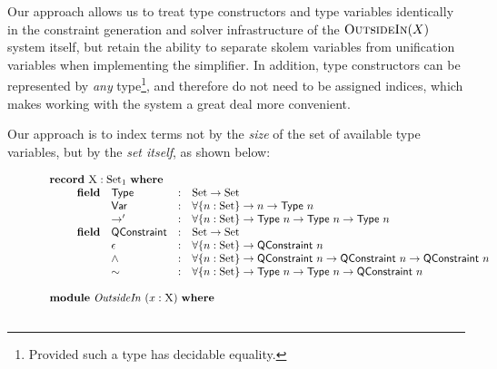 \documentclass[a4paper]{jfp}
\newcommand{\outsidein}{\textsc{OutsideIn}(X)}
\begin{document}
Our approach allows us to treat type constructors and type variables identically in the constraint generation and solver infrastructure of the
$\outsidein$ system itself, but retain the ability to separate skolem variables from unification variables when implementing the simplifier. 
In addition, type constructors can be represented by \emph{any} type\footnote{Provided such a type has decidable equality.}, and therefore
do not need to be assigned indices, which makes working with the system a great deal more convenient. 

Our approach is to index terms not by the \emph{size} of the set of available type variables, but by the \emph{set itself}, as shown below:
\nopagebreak
\begin{figure}[H]
\begin{displaymath}
   \begin{array}{l}
   \textbf{record}\ \textsc{X} : \text{Set}_1\ \textbf{where} \\ \qquad
   \begin{array}{llcl} 
   \textbf{field} & \textsf{Type} & : & \text{Set} \rightarrow \text{Set} \\ 
                  & \textsf{Var} & : & \forall \{ n : \text{Set} \} \rightarrow n \rightarrow \textsf{Type}\ n \\
                  & \rightarrow' & : & \forall \{ n : \text{Set} \} \rightarrow \textsf{Type}\ n \rightarrow \textsf{Type}\ n 
                                                                    \rightarrow \textsf{Type} \ n \\
   \textbf{field} & \textsf{QConstraint} & : & \text{Set} \rightarrow \text{Set} \\
                  & \epsilon & : & \forall \{ n : \text{Set} \} \rightarrow \textsf{QConstraint}\ n \\
                  & \land & : & \forall \{ n : \text{Set} \} \rightarrow \textsf{QConstraint}\ n \rightarrow \textsf{QConstraint}\ n 
                                                             \rightarrow \textsf{QConstraint}\ n \\
                  & \sim & : &\forall \{ n : \text{Set} \} \rightarrow  \textsf{Type}\ n \rightarrow \textsf{Type}\ n 
                                                           \rightarrow  \textsf{QConstraint}\ n\\
   \end{array}\\\\
   \textbf{module}\ \mathit{OutsideIn}\ ( x : \textsc{X})\ \textbf{where} \\ \qquad 

\end{array}
\end{displaymath}
\end{figure}
\end{document}
